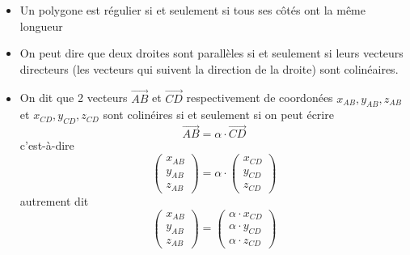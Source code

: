 \documentclass{exam}
\begin{document}
\begin{itemize}
  \item Un polygone est régulier si et seulement si tous ses côtés ont la même longueur
  \item On peut dire que deux droites sont parallèles si et seulement si leurs vecteurs directeurs (les vecteurs qui suivent la direction de la droite) sont colinéaires.
  \item On dit que 2 vecteurs $\overrightarrow{AB}$ et $\overrightarrow{CD}$ respectivement de coordonées $x_{AB}, y_{AB}, z_{AB}$ et $x_{CD}, y_{CD}, z_{CD}$ sont colinéires si et seulement si on peut écrire 
  \[
  \overrightarrow{AB} = \alpha \cdot \overrightarrow{CD}
  \]
 c'est-à-dire
  \[
  \begin{pmatrix}
    x_{AB} \\
    y_{AB} \\ 
    z_{AB}
  \end{pmatrix}
  = 
  \alpha \cdot
  \begin{pmatrix}
    x_{CD} \\
    y_{CD} \\ 
    z_{CD}
  \end{pmatrix}
\] 
autrement dit 
\[
  \begin{pmatrix}
    x_{AB} \\
    y_{AB} \\ 
    z_{AB}
  \end{pmatrix}
  =
  \begin{pmatrix}
    \alpha \cdot x_{CD} \\
    \alpha \cdot y_{CD} \\ 
    \alpha \cdot z_{CD}
  \end{pmatrix}
\] 
\end{itemize}
\end{document}
